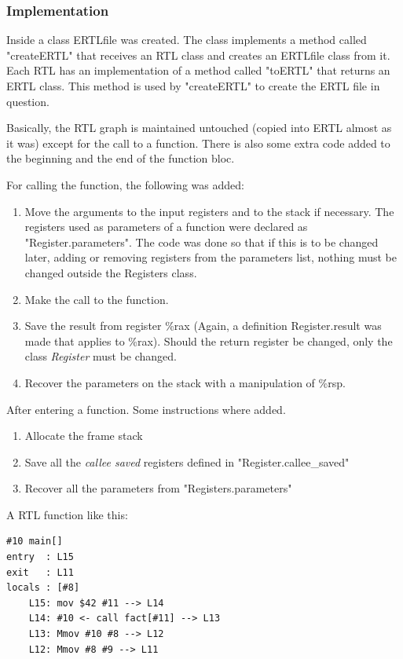 \documentclass[conference]{IEEEtran}
\begin{document}
\subsubsection{Implementation}

Inside a class ERTLfile was created. The class implements a method called "createERTL" that receives an RTL class and creates an ERTLfile class from it. Each RTL has an implementation of a method called "toERTL" that returns an ERTL class. This method is used by "createERTL" to create the ERTL file in question.

Basically, the RTL graph is maintained untouched (copied into ERTL almost as it was) except for the call to a function. There is also some extra code added to the beginning and the end of the function bloc.

For calling the function, the following was added:

\begin{enumerate}
	\item Move the arguments to the input registers and to the stack if necessary. The registers used as parameters of a function were declared as "Register.parameters". The code was done so that if this is to be changed later, adding or removing registers from the parameters list, nothing must be changed outside the Registers class. 
	\item Make the call to the function.
	\item Save the result from register \%rax (Again, a definition Register.result was made that applies to \%rax). Should the return register be changed, only the class \textit{Register} must be changed.
	\item Recover the parameters on the stack with a manipulation of \%rsp.
\end{enumerate}

After entering a function. Some instructions where added.

\begin{enumerate}
	\item Allocate the frame stack
	\item Save all the \textit{callee saved} registers defined in "Register.callee\_saved"
	\item Recover all the parameters from "Registers.parameters"
	
\end{enumerate}

A RTL function like this:

\begin{lstlisting}
#10 main[]
entry  : L15
exit   : L11
locals : [#8]
	L15: mov $42 #11 --> L14
	L14: #10 <- call fact[#11] --> L13
	L13: Mmov #10 #8 --> L12
	L12: Mmov #8 #9 --> L11
\end{lstlisting}
\end{document}
